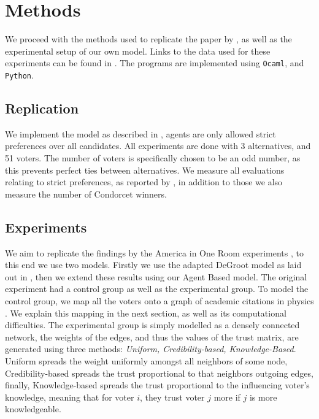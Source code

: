 \chapter{Methods}
\label{Methods}

We proceed with the methods used to replicate the paper by \citet{radDeliberationSinglePeakednessCoherent2021}, as well as the experimental setup of our own model. Links to the data used for these experiments can be found in . The programs are implemented using \texttt{Ocaml}, and \texttt{Python}.


\section{Replication}
We implement the model as described in , agents are only allowed strict preferences over all candidates. All experiments are done with 3 alternatives, and 51 voters. The number of voters is specifically chosen to be an odd number, as this prevents perfect ties between alternatives. We measure all evaluations relating to strict preferences, as reported by \citet{radDeliberationSinglePeakednessCoherent2021}, in addition to those we also measure the number of Condorcet winners.

\section{Experiments}
We aim to replicate the findings by the America in One Room experiments \cite{fishkinCanDeliberationHave2024}, to this end we use two models. Firstly we use the adapted DeGroot model as laid out in , then we extend these results using our Agent Based model. The original experiment had a control group as well as the experimental group. To model the control group, we map all the voters onto a graph of academic citations in physics \cite{nr}. We explain this mapping in the next section, as well as its computational difficulties. The experimental group is simply modelled as a densely connected network, the weights of the edges, and thus the values of the trust matrix, are generated using three methods: \textit{Uniform, Credibility-based, Knowledge-Based}. Uniform spreads the weight uniformly amongst all neighbors of some node, Credibility-based spreads the trust proportional to that neighbors outgoing edges, finally, Knowledge-based spreads the trust proportional to the influencing voter's knowledge, meaning that for voter $i$, they trust voter $j$ more if $j$ is more knowledgeable.

